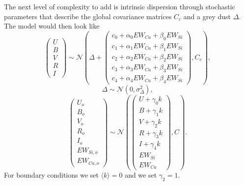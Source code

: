 \documentclass[11pt, oneside]{article}   	%
\begin{document}
The next level of complexity to add is intrinsic dispersion through stochastic parameters that describe the global  covariance matrices
$C_{c}$ and a grey dust $\Delta$.  The model would then look like
\begin{equation*}
\left(
\begin{matrix}
U\\B\\V\\R\\I
\end{matrix}
\right) \sim \mathcal{N}
\left(
\Delta +
\left(
\begin{matrix}
c_0+\alpha_0 EW_{Ca} + \beta_0 EW_{Si} \\
c_1+\alpha_1 EW_{Ca} + \beta_1 EW_{Si}  \\
c_2+\alpha_2 EW_{Ca} + \beta_2 EW_{Si} \\
c_3+\alpha_3 EW_{Ca} + \beta_3 EW_{Si} \\
c_4+\alpha_4 EW_{Ca} + \beta_4 EW_{Si}
\end{matrix}
\right)
,C_{c}
\right),
\end{equation*}
\begin{equation*}
\Delta \sim \mathcal{N}(0,\sigma^2_\Delta),
\end{equation*}
\begin{equation*}
\left(
\begin{matrix}
U_o\\B_o\\ V_o\\R_o\\I_o\\EW_{Si, o}\\ EW_{Ca, o}
\end{matrix}
\right) \sim \mathcal{N}
\left(
\left(
\begin{matrix}
U +\gamma_0 k \\B +\gamma_1 k \\V+\gamma_2 k\\R+\gamma_3 k\\I+\gamma_4 k\\
EW_{Si}\\ EW_{Ca}
\end{matrix}
\right)
,C
\right).
\end{equation*}
For boundary conditions we set  $\langle k \rangle=0$ and we set $\gamma_2=1$.
\end{document}
